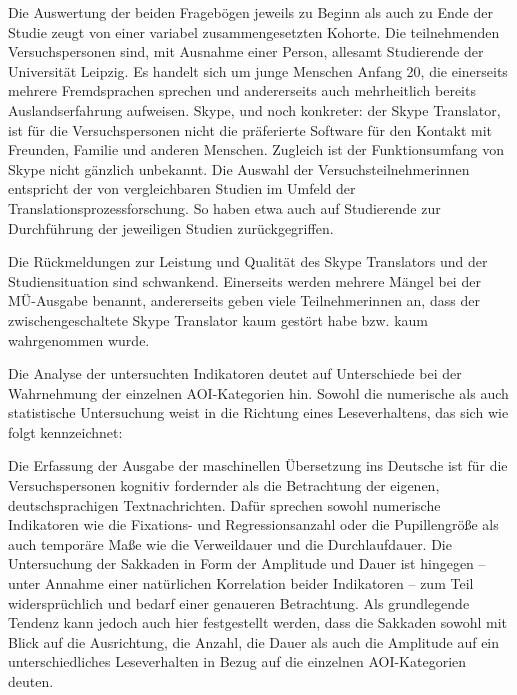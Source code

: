 Die Auswertung der beiden Fragebögen jeweils zu Beginn als auch zu Ende der Studie zeugt von einer variabel zusammengesetzten Kohorte. Die teilnehmenden Versuchspersonen sind, mit Ausnahme einer Person, allesamt Studierende der Universität Leipzig. Es handelt sich um junge Menschen Anfang 20, die einerseits mehrere Fremdsprachen sprechen und andererseits auch mehrheitlich bereits Auslandserfahrung aufweisen. Skype, und noch konkreter: der Skype Translator, ist für die Versuchspersonen nicht die präferierte Software für den Kontakt mit Freunden, Familie und anderen Menschen. Zugleich ist der Funktionsumfang von Skype nicht gänzlich unbekannt. Die Auswahl der Versuchsteilnehmer{\textperiodcentered}innen entspricht der von vergleichbaren Studien im Umfeld der Translationsprozessforschung. So haben etwa auch \citet{hyona_pupil_1995, beiswenger_eyetracking_2017} auf Studierende zur Durchführung der jeweiligen Studien zurückgegriffen.

Die Rückmeldungen zur Leistung und Qualität des Skype Translators und der Studiensituation sind schwankend. Einerseits werden mehrere Mängel bei der MÜ-Ausgabe benannt, andererseits geben viele Teilnehmer{\textperiodcentered}innen an, dass der zwischengeschaltete Skype Translator kaum gestört habe bzw. kaum wahrgenommen wurde.

Die Analyse der untersuchten Indikatoren deutet auf Unterschiede bei der Wahrnehmung der einzelnen AOI-Kategorien hin. Sowohl die numerische als auch statistische Untersuchung weist in die Richtung eines Leseverhaltens, das sich wie folgt kennzeichnet: 

Die Erfassung der Ausgabe der maschinellen Übersetzung ins Deutsche ist für die Versuchspersonen kognitiv fordernder als die Betrachtung der eigenen, deutschsprachigen Textnachrichten. Dafür sprechen sowohl numerische Indikatoren wie die Fixations- und Regressionsanzahl oder die Pupillengröße als auch temporäre Maße wie die Verweildauer und die Durchlaufdauer. Die Untersuchung der Sakkaden in Form der Amplitude und Dauer ist hingegen -- unter Annahme einer natürlichen Korrelation beider Indikatoren -- zum Teil widersprüchlich und bedarf einer genaueren Betrachtung. Als grundlegende Tendenz kann jedoch auch hier festgestellt werden, dass die Sakkaden sowohl mit Blick auf die Ausrichtung, die Anzahl, die Dauer als auch die Amplitude auf ein unterschiedliches Leseverhalten in Bezug auf die einzelnen AOI-Kategorien deuten.

